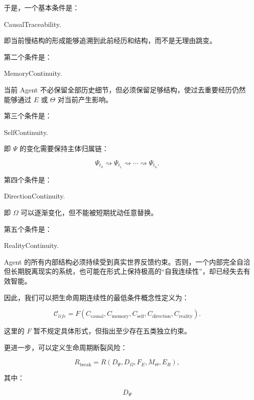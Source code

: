 于是，一个基本条件是：

\begin{statementbox}
CausalTraceability.
\end{statementbox}

即当前慢结构的形成能够追溯到此前经历和结构，而不是无理由跳变。

第二个条件是：

\begin{statementbox}
MemoryContinuity.
\end{statementbox}

当前 Agent 不必保留全部历史细节，但必须保留足够结构，使过去重要经历仍然能够通过 $E$ 或 $\Theta$ 对当前产生影响。

第三个条件是：

\begin{statementbox}
SelfContinuity.
\end{statementbox}

即 $\Psi$ 的变化需要保持主体归属链：

\[
\Psi_{t_0}
\rightsquigarrow
\Psi_{t_1}
\rightsquigarrow
\cdots
\rightsquigarrow
\Psi_{t_n}.
\]

第四个条件是：

\begin{statementbox}
DirectionContinuity.
\end{statementbox}

即 $\Omega$ 可以逐渐变化，但不能被短期扰动任意替换。

第五个条件是：

\begin{statementbox}
RealityContinuity.
\end{statementbox}

Agent 的所有内部结构必须持续受到真实世界反馈约束。否则，一个内部完全自洽但长期脱离现实的系统，也可能在形式上保持极高的“自我连续性”，却已经失去有效智能。

因此，我们可以把生命周期连续性的最低条件概念性定义为：

\[
\mathcal{C}_{life}
=
F
\left(
C_{\mathrm{causal}},
C_{\mathrm{memory}},
C_{\mathrm{self}},
C_{\mathrm{direction}},
C_{\mathrm{reality}}
\right).
\]

这里的 $F$ 暂不规定具体形式，但指出至少存在五类独立约束。

更进一步，可以定义生命周期断裂风险：

\[
R_{\mathrm{break}}
=
R
\left(
D_\Psi,
D_\Omega,
F_E,
M_\Theta,
E_R
\right),
\]

其中：

\[
D_\Psi
\]

